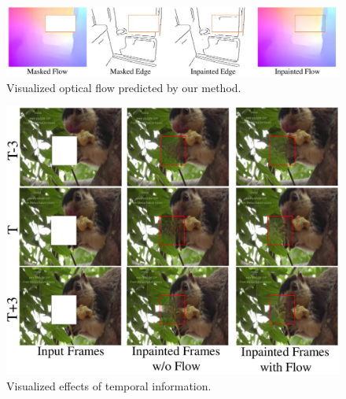 \begin{figure}[t]
	\centering
	\includegraphics[width=1.0\columnwidth]{flowvis} %
	\caption{Visualized optical flow predicted by our method.}
	\label{flowvis}
\end{figure}
\begin{figure}[t]
	\centering
	\includegraphics[width=1.0\columnwidth]{flow_vis} %
	\caption{Visualized effects of temporal information.}
	\label{flow_vis}
\end{figure}

